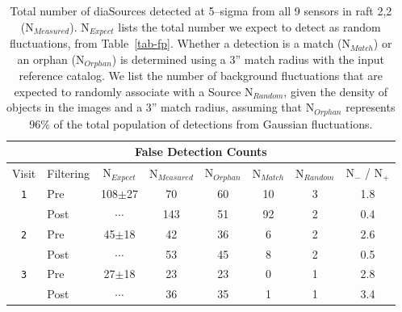 \documentclass[floatfix, apj]{emulateapj}
\begin{document}
\begin{table}[t]
\centering
\begin{tabular}{clc|ccccc}
\hline
\multicolumn{8}{|c|}{False Detection Counts} \\
\hline
Visit   & Filtering & N$_{Expect}$ & N$_{Measured}$ &  N$_{Orphan}$ & N$_{Match}$ & N$_{Random}$ & N$_{-}$ / N$_{+}$\\
\hline
{\tt 1} & Pre      & 108$\pm$27   & 70      &60         & 10 & 3  & 1.8 \\ 
        & Post     & $\cdots$     & 143     &51         & 92 & 2  & 0.4 \\
{\tt 2} & Pre      & 45$\pm$18    & 42      &36         & 6  & 2  & 2.6 \\
        & Post     & $\cdots$     & 53      &45         & 8  & 2  & 0.5 \\
{\tt 3} & Pre      & 27$\pm$18    & 23      &23         & 0  & 1  & 2.8 \\
        & Post     & $\cdots$     & 36      &35         & 1  & 1  & 3.4 \\
\end{tabular}
\caption{{\rm Total number of diaSources detected at 5--sigma from all 9 sensors in raft 2,2 (N$_{Measured}$).
  N$_{Expect}$ lists the total number we expect to detect as random fluctuations, from Table~\ref{tab-fp}.
  Whether a detection is a match (N$_{Match}$) or an orphan (N$_{Orphan}$) is determined using a 3'' match radius with the input reference catalog.
  We list the number of background fluctuations that are expected to randomly associate with a Source N$_{Random}$, given the density of objects in the images and a 3'' match radius, assuming that N$_{Orphan}$ represents 96\% of the total population of detections from Gaussian fluctuations.
  \label{tab-bestfp10}}}
\end{table}
\end{document}
